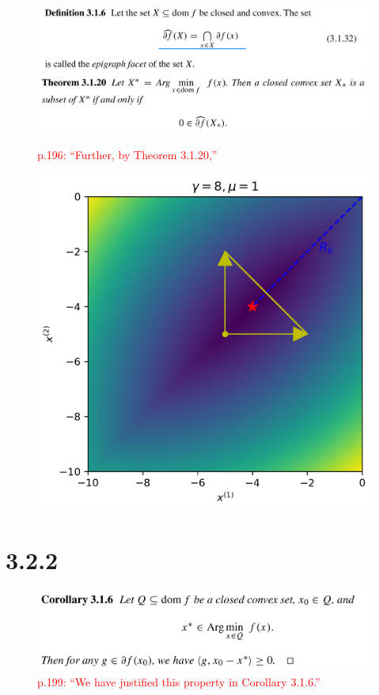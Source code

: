 \documentclass[a4paper, 14pt, dvipdfmx]{extarticle}
\newcommand{\red}[1]{\textcolor{red}{#1}}
\begin{document}
\begin{figure}[H]
    \centering
    \includegraphics[width=\columnwidth]{def316.png}
    \includegraphics[width=\columnwidth]{thm3120.jpg}
    \caption{\red{p.196: ``Further, by Theorem 3.1.20,''}}
    \label{fig:label}
\end{figure}

\begin{figure}[H]
    \centering
    \includegraphics[width=\columnwidth]{fkImshow.png}
\end{figure}

\section*{3.2.2}

\begin{figure}[H]
    \centering
    \includegraphics[width=\columnwidth]{col316.png}
    \caption{\red{p.199: ``We have justified this property in Corollary 3.1.6.''}}
\end{figure}
\end{document}
